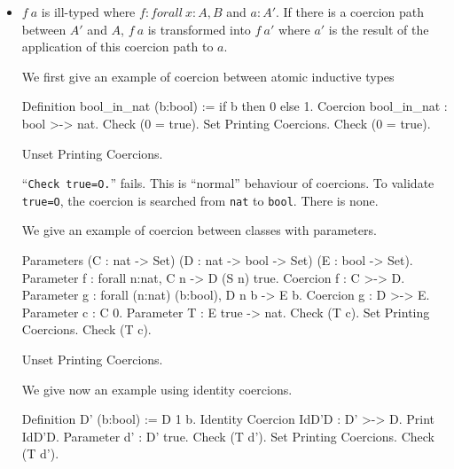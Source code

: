\begin{itemize}
\item $f~a$ is ill-typed where $f:forall~x:A,B$ and $a:A'$. If there is a
      coercion path between $A'$ and $A$, $f~a$ is transformed into
      $f~a'$ where $a'$ is the result of the application of this
      coercion path to $a$.

We first give an example of coercion between atomic inductive types

\begin{coq_example}
Definition bool_in_nat (b:bool) := if b then 0 else 1.
Coercion bool_in_nat : bool >-> nat.
Check (0 = true).
Set Printing Coercions.
Check (0 = true).
\end{coq_example}

\begin{coq_eval}
Unset Printing Coercions.
\end{coq_eval}

\Warning ``\verb|Check true=O.|'' fails. This is ``normal'' behaviour of
coercions. To validate \verb|true=O|, the coercion is searched from
\verb=nat= to \verb=bool=. There is none.

We give an example of coercion between classes with parameters.

\begin{coq_example}
Parameters
   (C : nat -> Set) (D : nat -> bool -> Set) (E : bool -> Set).
Parameter f : forall n:nat, C n -> D (S n) true.
Coercion f : C >-> D.
Parameter g : forall (n:nat) (b:bool), D n b -> E b.
Coercion g : D >-> E.
Parameter c : C 0.
Parameter T : E true -> nat.
Check (T c).
Set Printing Coercions.
Check (T c).
\end{coq_example}

\begin{coq_eval}
Unset Printing Coercions.
\end{coq_eval}

We give now an example using identity coercions.

\begin{coq_example}
Definition D' (b:bool) := D 1 b.
Identity Coercion IdD'D : D' >-> D.
Print IdD'D.
Parameter d' : D' true.
Check (T d').
Set Printing Coercions.
Check (T d').
\end{coq_example}


\end{itemize}
